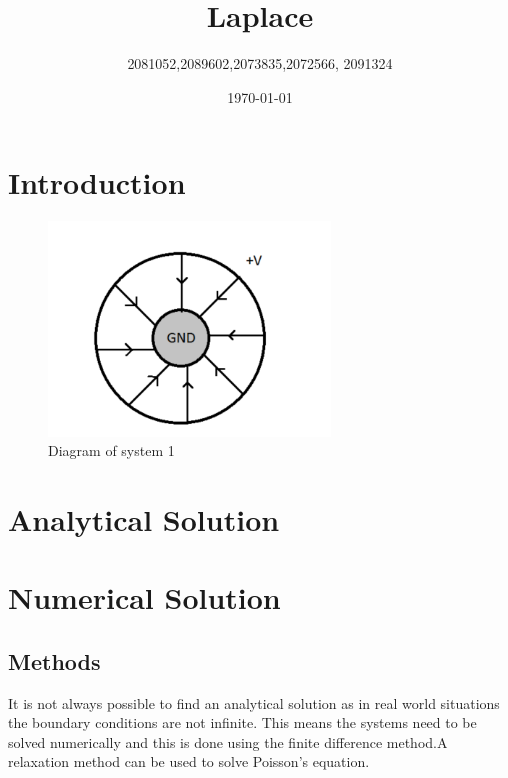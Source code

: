 \documentclass{article}
\begin{document}
\title{Laplace}

\author{2081052,2089602,2073835,2072566, 2091324}

\date{\today}

\maketitle

\begin{abstract}

\end{abstract}

\section{Introduction}

\begin{figure}[hp]
\centering
\includegraphics[width=75mm]{System1.pdf}
\caption{Diagram of system 1}
\label{fig:System1}
\end{figure}

\section{Analytical Solution}


 

\section{Numerical Solution}
\subsection{Methods}

It is not always possible to find an analytical solution as in real world 
situations the boundary conditions are not infinite. This means the systems
 need to be solved numerically and this is done using the finite difference
method.A relaxation method can be used to solve Poisson's equation.
\end{document}
